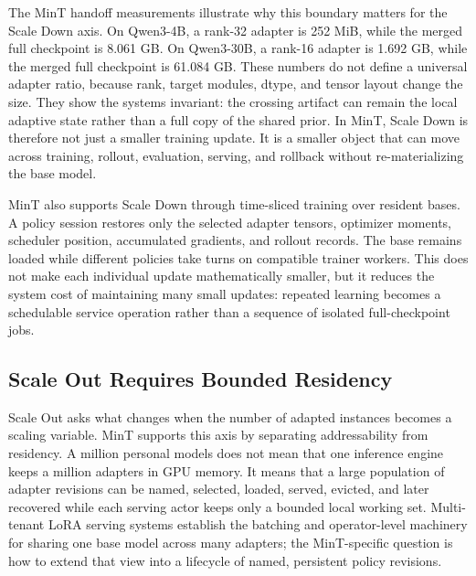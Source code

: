 \documentclass{llmxive}
\providecommand{\pony}[1]{#1}
\begin{document}
The MinT handoff measurements illustrate why this boundary matters for the Scale Down axis. On Qwen3-4B, a rank-32 adapter is 252 MiB, while the merged full checkpoint is 8.061 GB. On Qwen3-30B, a rank-16 adapter is 1.692 GB, while the merged full checkpoint is 61.084 GB. These numbers do not define a universal adapter ratio, because rank, target modules, dtype, and tensor layout change the size. They show the systems invariant: the crossing artifact can remain the local adaptive state rather than a full copy of the shared prior. In MinT, Scale Down is therefore not just a smaller training update. It is a smaller object that can move across training, rollout, evaluation, serving, and rollback without re-materializing the base model.

MinT also supports Scale Down through time-sliced training over resident bases. A policy session restores only the selected adapter tensors, optimizer moments, scheduler position, accumulated gradients, and rollout records. The base remains loaded while different policies take turns on compatible trainer workers. This does not make each individual update mathematically smaller, but it reduces the system cost of maintaining many small updates: repeated learning becomes a schedulable service operation rather than a sequence of isolated full-checkpoint jobs.

\subsection{\pony{Scale Out Requires Bounded Residency}}\label{subsec:infra-scale-out-residency}

Scale Out asks what changes when the number of adapted instances becomes a scaling variable. MinT supports this axis by separating addressability from residency. A million personal models does not mean that one inference engine keeps a million adapters in GPU memory. It means that a large population of adapter revisions can be named, selected, loaded, served, evicted, and later recovered while each serving actor keeps only a bounded local working set. Multi-tenant LoRA serving systems \citep{sheng2023slora,chen2023punica,zhou2025dynamic} establish the batching and operator-level machinery for sharing one base model across many adapters; the MinT-specific question is how to extend that view into a lifecycle of named, persistent policy revisions.
\end{document}
